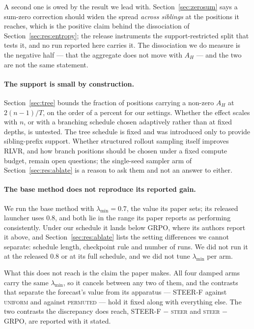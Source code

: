 \documentclass[11pt]{article}
\newcommand{\AH}{A_{H}}
\begin{document}
A second one is owed by the result we lead with. Section~\ref{sec:zerosum} says a
sum-zero correction should widen the spread \emph{across siblings} at the positions
it reaches, which is the positive claim behind the dissociation of
Section~\ref{sec:res:entropy}; the release instruments the support-restricted split
that tests it, and no run reported here carries it. The dissociation we do
measure is the negative half --- that the aggregate does not move with $\AH$ --- and
the two are not the same statement.

\paragraph{The support is small by construction.}
Section~\ref{sec:tree} bounds the fraction of positions carrying a non-zero $\AH$ at
$2(n-1)/T$, on the order of a percent for our settings. Whether the effect scales
with $n$, or with a branching schedule chosen adaptively rather than at fixed
depths, is untested. The tree schedule is fixed and was introduced only to provide
sibling-prefix support. Whether structured rollout sampling itself improves RLVR,
and how branch positions should be chosen under a fixed compute budget, remain open
questions; the single-seed sampler arm of Section~\ref{sec:res:ablate} is a reason
to ask them and not an answer to either.

\paragraph{The base method does not reproduce its reported gain.} We run the
base method with $\lambda_{\min} = 0.7$, the value its paper sets; its released
launcher uses $0.8$, and both lie in the range its paper reports as performing
consistently. Under our schedule it lands below GRPO, where its authors report it
above, and Section~\ref{sec:res:ablate} lists the setting differences we cannot
separate: schedule length, checkpoint rule and number of runs. We did not run it at
the released $0.8$ or at its full schedule, and we did not tune $\lambda_{\min}$ per
arm.

What this does not reach is the claim the paper makes. All four damped arms carry
the same $\lambda_{\min}$, so it cancels between any two of them, and the
contrasts that separate the forecast's value from its apparatus --- STEER-F
against \textsc{uniform} and against \textsc{permuted} --- hold it fixed along
with everything else. The two contrasts the discrepancy does reach, STEER-F $-$
\textsc{steer} and \textsc{steer} $-$ GRPO, are reported with it stated.
\end{document}
